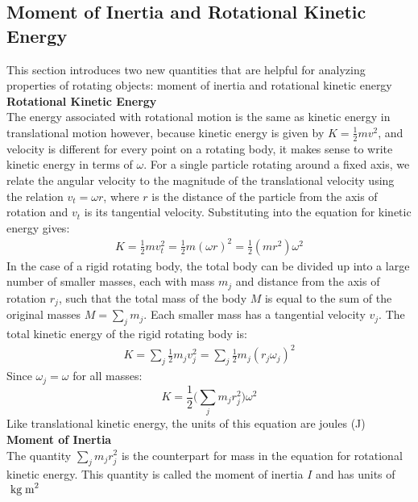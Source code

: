 \documentclass[a4paper]{article}
\let\bf\textbf
\newcommand\kgmm{\text{ kg\;m}^{2}}
\begin{document}
\subsection{Moment of Inertia and Rotational Kinetic Energy}
This section introduces two new quantities that are helpful for analyzing properties of rotating objects: moment of inertia and rotational kinetic energy
\vspace{2mm}\\
\bf{Rotational Kinetic Energy}
\vspace{2mm}\\
The energy associated with rotational motion is the same as kinetic energy in translational motion however, because kinetic energy is given by $K = \frac{1}{2}mv^2$, and velocity is different for every point on a rotating body, it makes sense to write kinetic energy in terms of $\omega$. For a single particle rotating around a fixed axis, we relate the angular velocity to the magnitude of the translational velocity using the relation $v_t = \omega r$, where $r$ is the distance of the particle from the axis of rotation and $v_t$ is its tangential velocity. Substituting into the equation for kinetic energy gives:
\begin{align*}
    K = \frac{1}{2}mv_t^2 = \frac{1}{2}m(\omega r)^2 = \frac{1}{2}(mr^2)\omega^2
\end{align*}
In the case of a rigid rotating body, the total body can be divided up into a large number of smaller masses, each with mass $m_j$ and distance from the axis of rotation $r_j$, such that the total mass of the body $M$ is equal to the sum of the original masses $M = \sum_{j}m_j$. Each smaller mass has a tangential velocity $v_j$. The total kinetic energy of the rigid rotating body is:
\begin{align*}
    K = \sum_{j}\frac{1}{2}m_jv^2_j = \sum_{j}\frac{1}{2}m_j(r_j\omega_j)^2
\end{align*}
Since $\omega_j = \omega$ for all masses:
\begin{equation}
    K = \frac{1}{2}\bigg(\sum_{j}m_jr^2_j\bigg)\omega^2 
\end{equation}
Like translational kinetic energy, the units of this equation are joules (J)
\vspace{2mm}\\
\bf{Moment of Inertia}
\vspace{2mm}\\
The quantity $\sum\limits_j m_jr^2_j$ is the counterpart for mass in the equation for rotational kinetic energy. This quantity is called the moment of inertia $I$ and has units of$\kgmm$
\end{document}
